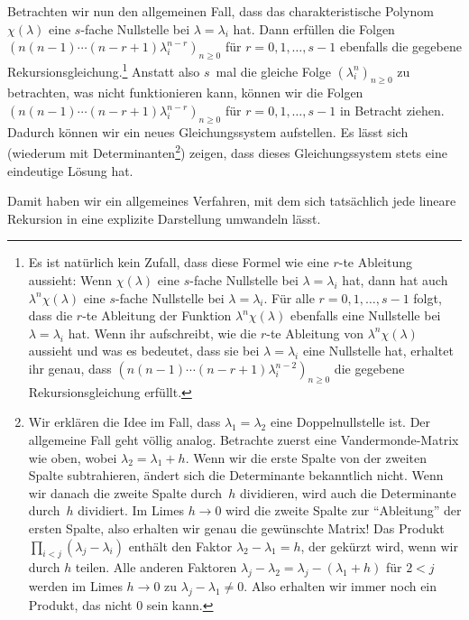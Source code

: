 Betrachten wir nun den allgemeinen Fall, dass das charakteristische Polynom $\chi(\lambda)$ eine $s$-fache Nullstelle bei $\lambda=\lambda_i$ hat. Dann erfüllen die Folgen $(n(n-1)\dotsm(n-r+1)\lambda_i^{n-r})_{n\geqslant 0}$ für $r=0,1,\dotsc,s-1$ ebenfalls die gegebene Rekursionsgleichung.\footnote{Es ist natürlich kein Zufall, dass diese Formel wie eine $r$-te Ableitung aussieht: Wenn $\chi(\lambda)$ eine $s$-fache Nullstelle bei $\lambda=\lambda_i$ hat, dann hat auch $\lambda^n\chi(\lambda)$ eine $s$-fache Nullstelle bei $\lambda=\lambda_i$. Für alle $r=0,1,\dotsc,s-1$ folgt, dass die $r$-te Ableitung der Funktion $\lambda^n\chi(\lambda)$ ebenfalls eine Nullstelle bei $\lambda=\lambda_i$ hat. Wenn ihr aufschreibt, wie die $r$-te Ableitung von $\lambda^n\chi(\lambda)$ aussieht und was es bedeutet, dass sie bei $\lambda=\lambda_i$ eine Nullstelle hat, erhaltet ihr genau, dass $(n(n-1)\dotsm(n-r+1)\lambda_i^{n-2})_{n\geqslant 0}$ die gegebene Rekursionsgleichung erfüllt.} Anstatt also $s$~mal die gleiche Folge $(\lambda_i^n)_{n\geqslant 0}$ zu betrachten, was nicht funktionieren kann, können wir die Folgen $(n(n-1)\dotsm(n-r+1)\lambda_i^{n-r})_{n\geqslant 0}$ für $r=0,1,\dotsc,s-1$ in Betracht ziehen. Dadurch können wir ein neues Gleichungssystem aufstellen. Es lässt sich (wiederum mit Determinanten\footnote{Wir erklären die Idee im Fall, dass $\lambda_1=\lambda_2$ eine Doppelnullstelle ist. Der allgemeine Fall geht völlig analog. Betrachte zuerst eine Vandermonde-Matrix wie oben, wobei $\lambda_2=\lambda_1+h$. Wenn wir die erste Spalte von der zweiten Spalte subtrahieren, ändert sich die Determinante bekanntlich nicht. Wenn wir danach die zweite Spalte durch~$h$ dividieren, wird auch die Determinante durch~$h$ dividiert. Im Limes $h\rightarrow 0$ wird die zweite Spalte zur \enquote{Ableitung} der ersten Spalte, also erhalten wir genau die gewünschte Matrix! Das Produkt $\prod_{i<j}(\lambda_j-\lambda_i)$ enthält den Faktor $\lambda_2-\lambda_1=h$, der gekürzt wird, wenn wir durch $h$ teilen. Alle anderen Faktoren $\lambda_j-\lambda_2=\lambda_j-(\lambda_1+h)$ für $2<j$ werden im Limes $h\rightarrow 0$ zu $\lambda_j-\lambda_1\neq 0$. Also erhalten wir immer noch ein Produkt, das nicht $0$ sein kann.}) zeigen, dass dieses Gleichungssystem stets eine eindeutige Lösung hat.

Damit haben wir ein allgemeines Verfahren, mit dem sich tatsächlich jede lineare Rekursion in eine explizite Darstellung umwandeln lässt.

